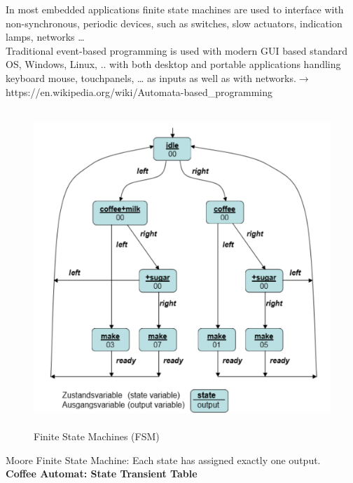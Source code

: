 In most embedded applications finite state machines are used to interface with non-synchronous, periodic devices, such as switches, slow actuators, indication lamps, networks {\dots} \\

Traditional event-based programming is used with modern GUI based standard OS, Windows, Linux, .. with both desktop and portable applications handling keyboard mouse, touchpanels, {\dots} as inputs as well as with networks.$\rightarrow$  https://en.wikipedia.org/wiki/Automata-based\_programming\\

	\begin{figure}[h]
    \centering
    \includegraphics[width=14cm, height=12cm]{Images/image158.png}
    \caption{Finite State Machines (FSM)}
    \label{fig:Fig }
    \end{figure}                   

Moore Finite State Machine: Each state has assigned exactly one output. \\
\newpage
\textbf{Coffee Automat: State Transient Table}

